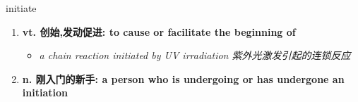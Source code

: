 
\begin{frame}
{\huge initiate}
\begin{center}
\begin{enumerate}\Large
  \item \textbf{vt. 创始,发动促进: to cause or facilitate the beginning of}
  \begin{itemize}
    \item \em{\Large{a chain reaction initiated by UV irradiation 紫外光激发引起的连锁反应}}
  \end{itemize}
  \item \textbf{n. 刚入门的新手: a person who is undergoing or has undergone an initiation}
\end{enumerate}
\end{center}
\end{frame}
